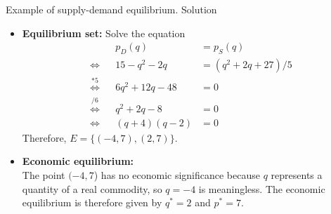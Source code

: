 \documentclass[9pt]{beamer}
\begin{document}
\begin{frame}{Example of supply-demand equilibrium. Solution}
\begin{minipage}{0.55\textwidth}
\begin{itemize}[leftmargin = 0.3cm, label = $\bullet$, rightmargin = 0cm]
            \item \textbf{Equilibrium set:} Solve the equation 
            \vspace{-0.1cm}
            \begin{align*}
                                    && p_D(q) &= p_S(q) \\
                \Longleftrightarrow && 15 - q^2 - 2q &= (q^2 + 2q + 27)/5 \\
                \stackrel{*5}{\Longleftrightarrow} && 6q^2 + 12q - 48 &= 0 \\
                \stackrel{/6}{\Longleftrightarrow} && q^2 + 2q - 8 &= 0 \\
                \Longleftrightarrow && (q + 4)(q - 2) &= 0
            \end{align*}
            Therefore, $E = \{(-4, 7), (2, 7)\}$.
        \end{itemize}
        
    \end{minipage}
    \vspace{-0.2cm}
    
    \begin{itemize}[leftmargin = 0.3cm, label = $\bullet$, rightmargin = 0cm]
        \item \textbf{Economic equilibrium:} \\
              The point $(-4, 7$) has no economic significance because $q$ represents a quantity of a real commodity, so $q = -4$ is meaningless. The economic equilibrium is therefore given by $q^* = 2$ and $p^* = 7$.
    \end{itemize}
    
\end{frame}
\end{document}
